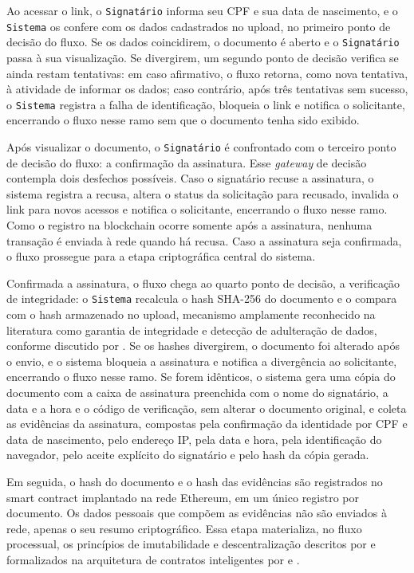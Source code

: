 \documentclass[
    12pt,
    a4paper,
    oneside,
    chapter=TITLE,
    section=TITLE,
    subsection=TITLE,
    subsubsection=TITLE,
    sumario=tradicional,
    english,
    brazil
]{abntex2}
\newcommand{\elem}[1]{\texttt{#1}}
\begin{document}
Ao acessar o link, o \elem{Signatário} informa seu CPF e sua data de nascimento, e o \elem{Sistema} os confere com os dados cadastrados no upload, no primeiro ponto de decisão do fluxo. Se os dados coincidirem, o documento é aberto e o \elem{Signatário} passa à sua visualização. Se divergirem, um segundo ponto de decisão verifica se ainda restam tentativas: em caso afirmativo, o fluxo retorna, como nova tentativa, à atividade de informar os dados; caso contrário, após três tentativas sem sucesso, o \elem{Sistema} registra a falha de identificação, bloqueia o link e notifica o solicitante, encerrando o fluxo nesse ramo sem que o documento tenha sido exibido.

Após visualizar o documento, o \elem{Signatário} é confrontado com o terceiro ponto de decisão do fluxo: a confirmação da assinatura. Esse \emph{gateway} de decisão contempla dois desfechos possíveis. Caso o signatário recuse a assinatura, o sistema registra a recusa, altera o status da solicitação para recusado, invalida o link para novos acessos e notifica o solicitante, encerrando o fluxo nesse ramo. Como o registro na blockchain ocorre somente após a assinatura, nenhuma transação é enviada à rede quando há recusa. Caso a assinatura seja confirmada, o fluxo prossegue para a etapa criptográfica central do sistema.

Confirmada a assinatura, o fluxo chega ao quarto ponto de decisão, a verificação de integridade: o \elem{Sistema} recalcula o hash SHA-256 do documento e o compara com o hash armazenado no upload, mecanismo amplamente reconhecido na literatura como garantia de integridade e detecção de adulteração de dados, conforme discutido por . Se os hashes divergirem, o documento foi alterado após o envio, e o sistema bloqueia a assinatura e notifica a divergência ao solicitante, encerrando o fluxo nesse ramo. Se forem idênticos, o sistema gera uma cópia do documento com a caixa de assinatura preenchida com o nome do signatário, a data e a hora e o código de verificação, sem alterar o documento original, e coleta as evidências da assinatura, compostas pela confirmação da identidade por CPF e data de nascimento, pelo endereço IP, pela data e hora, pela identificação do navegador, pelo aceite explícito do signatário e pelo hash da cópia gerada.

Em seguida, o hash do documento e o hash das evidências são registrados no smart contract implantado na rede Ethereum, em um único registro por documento. Os dados pessoais que compõem as evidências não são enviados à rede, apenas o seu resumo criptográfico. Essa etapa materializa, no fluxo processual, os princípios de imutabilidade e descentralização descritos por  e formalizados na arquitetura de contratos inteligentes por  e .
\end{document}
